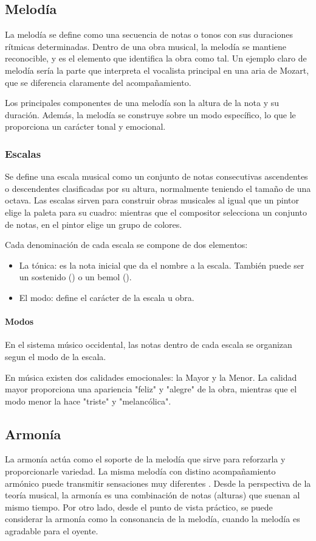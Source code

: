 \subsection{Melodía}
La melodía se define como una secuencia de notas o tonos con sus duraciones rítmicas determinadas. Dentro de una obra musical, la melodía se mantiene reconocible, y es el elemento que identifica la obra como tal. Un ejemplo claro de melodía sería la parte que interpreta el vocalista principal en una aria de Mozart, que se diferencia claramente del acompañamiento.
\par Los principales componentes de una melodía son la altura de la nota y su duración. Además, la melodía se construye sobre un modo específico, lo que le proporciona un carácter tonal y emocional.
\subsubsection{Escalas}
Se define una escala musical como un conjunto de notas consecutivas ascendentes o descendentes clasificadas por su altura, normalmente teniendo el tamaño de una octava.
Las escalas sirven para construir obras musicales al igual que un pintor elige la paleta para su cuadro: mientras que el compositor selecciona un conjunto de notas, en el pintor elige un grupo de colores.
\par Cada denominación de cada escala se compone de dos elementos:
\begin{itemize}
	\item La tónica: es la nota inicial que da el nombre a la escala. También puede ser un sostenido (\musSharp{}) o un bemol (\musFlat{}).
	\item El modo: define el carácter de la escala u obra.
\end{itemize}
\paragraph{Modos}
\par En el sistema músico occidental, las notas dentro de cada escala se organizan segun el modo de la escala. 
\par En música existen dos calidades emocionales: la Mayor y la Menor. La calidad mayor proporciona una apariencia "feliz" y "alegre" de la obra, mientras que el modo menor la hace "triste" y "melancólica".
\subsection{Armonía}
La armonía actúa como el soporte de la melodía que sirve para reforzarla y proporcionarle variedad. La misma melodía con distino acompañamiento armónico puede transmitir sensaciones muy diferentes \citep{armonia-musical-def-historia}.
Desde la perspectiva de la teoría musical, la armonía es una combinación de notas (alturas) que suenan al mismo tiempo. Por otro lado, desde el punto de vista práctico, se puede considerar la armonía como la consonancia de la melodía, cuando la melodía es agradable para el oyente.

